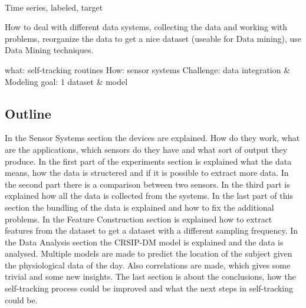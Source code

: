 		\
			
		Time series, labeled, target

		How to deal with different data systems, collecting the data and working with problems, reorganize the data to get a nice dataset (useable for Data mining), use Data Mining techniques.

		what: self-tracking routines
		How: sensor systems
		Challenge: data integration \& Modeling
		goal: 1 dataset \& model
		\fi

	\subsection{Outline}
		In the Sensor Systems section the devices are explained. How do they work, what are the applications, which sensors do they have and what sort of output they produce. In the first part of the experiments section is explained what the data means, how the data is structered and if it is possible to extract more data. In the second part there is a comparison between two sensors. In the third part is explained how all the data is collected from the systems. In the last part of this section the bundling of the data is explained and how to fix the additional problems. In the Feature Construction section is explained how to extract features from the dataset to get a dataset with a different sampling frequency. In the Data Analysis section the CRSIP-DM model is explained and the data is analysed. Multiple models are made to predict the location of the subject given the physiological data of the day. Also correlations are made, which gives some trivial and some new insights. The last section is about the conclusions, how the self-tracking process could be improved and what the next steps in self-tracking could be.
		
	
	\iffalse
		Klad		


		It's important to explain which systems are being used, what the data means and how the data looks like. Next section there is a comparison between the two physiological devices, what was really useful to learn the devices. The data collection is the most important part of the thesis, because it's explaining how everything was set up and done to get the provided dataset. - Modeling - Conclusions 

		In the Sensor System section the hardware is explained, what the sensors does, what the applications are and how it works. 
		In the experiments section describes useful derivative data, a comparison between the two physiological devices and the experiment to combine all three devices to a good dataset.
		Modeling: I made a dataset of 15 days with all kind of features. Set the deep sleep as target attribute and use WeKa to make a model, with a discussion why deep sleep as target, how the algorithm works and hopefully some insights of the model. 
	\fi
